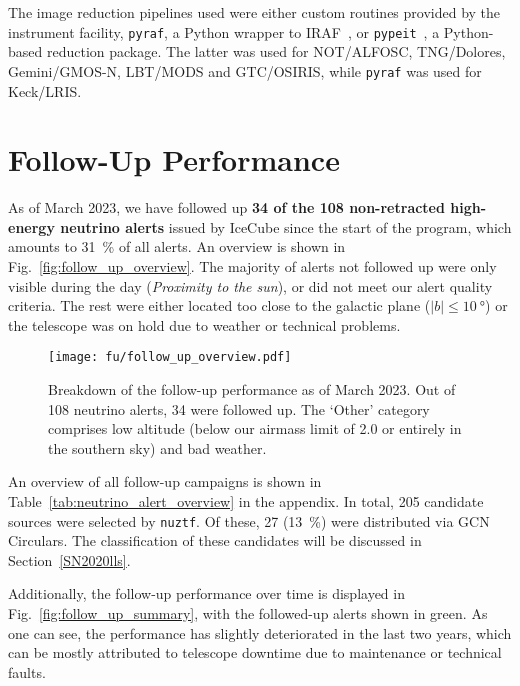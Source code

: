 The image reduction pipelines used were either custom routines provided by the instrument facility, \texttt{pyraf}, a Python wrapper to IRAF~, or \texttt{pypeit}~, a Python-based reduction package. The latter was used for NOT/ALFOSC, TNG/Dolores, Gemini/GMOS-N, LBT/MODS and GTC/OSIRIS, while \texttt{pyraf} was used for Keck/LRIS.

\section{Follow-Up Performance}
As of March 2023, we have followed up \textbf{34 of the 108 non-retracted high-energy neutrino alerts} issued by IceCube since the start of the program, which amounts to \SI{31}{\percent} of all alerts. An overview is shown in Fig.~\ref{fig:follow_up_overview}. The majority of alerts not followed up were only visible during the day (\textit{Proximity to the sun}), or did not meet our alert quality criteria. The rest were either located too close to the galactic plane ($|b|\leq\SI{10}{\degree}$) or the telescope was on hold due to weather or technical problems.

\begin{figure}[h!]
    \texttt{[image: fu/follow\_up\_overview.pdf]}
    \caption[Follow-up performance]{Breakdown of the follow-up performance as of March 2023. Out of 108 neutrino alerts, 34 were followed up. The `Other' category comprises low altitude (below our airmass limit of 2.0 or entirely in the southern sky) and bad weather.}
\end{figure}

An overview of all follow-up campaigns is shown in Table~\ref{tab:neutrino_alert_overview} in the appendix.
In total, 205 candidate sources were selected by \texttt{nuztf}. Of these, 27 (\SI{13}{\percent}) were distributed via GCN Circulars. The classification of these candidates will be discussed in Section~\ref{SN2020lls}.

Additionally, the follow-up performance over time is displayed in Fig.~\ref{fig:follow_up_summary}, with the followed-up alerts shown in green. As one can see, the performance has slightly deteriorated in the last two years, which can be mostly attributed to telescope downtime due to maintenance or technical faults.

